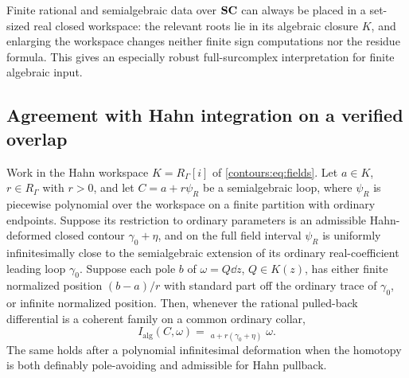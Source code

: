 \documentclass[11pt,letterpaper]{article}
\theoremstyle{definition}
\theoremstyle{remark}
\newcommand{\HInt}{\mathop{\int^{\!H}}\nolimits}
\numberwithin{equation}{section}
\begin{document}
Finite rational and semialgebraic data over $\mathbf{SC}$ can always be placed in a
set-sized real closed workspace: the relevant roots lie in its algebraic closure
$K$, and enlarging the workspace changes neither finite sign computations nor the
residue formula. This gives an especially robust full-surcomplex interpretation for
finite algebraic input.

\subsection{Agreement with Hahn integration on a verified overlap}
\label{contours:subsec:notconflated}
\begin{proposition}
\label{contours:prop:comparison}
Work in the Hahn workspace $K=R_\Gamma[i]$ of \eqref{contours:eq:fields}.
Let $a\in K$, $r\in R_\Gamma$ with $r>0$, and let $C=a+r\psi_R$ be a
semialgebraic loop, where $\psi_R$ is piecewise polynomial over the workspace
on a finite partition with ordinary endpoints. Suppose its
restriction to ordinary parameters is an admissible Hahn-deformed closed contour
$\gamma_0+\eta$, and on the full field interval $\psi_R$ is uniformly
infinitesimally close to the semialgebraic extension of its ordinary
real-coefficient leading loop $\gamma_0$. Suppose each
pole $b$ of $\omega=Q\dd z$, $Q\in K(z)$, has either finite normalized position
$(b-a)/r$ with standard part off the ordinary trace of $\gamma_0$, or infinite
normalized position. Then, whenever the rational pulled-back differential is a
coherent family on a common ordinary collar,
\[
  I_{\mathrm{alg}}(C,\omega)=\HInt_{a+r(\gamma_0+\eta)}\omega .
\]
The same holds after a polynomial infinitesimal deformation when the homotopy is
both definably pole-avoiding and admissible for Hahn pullback.
\end{proposition}
\end{document}

